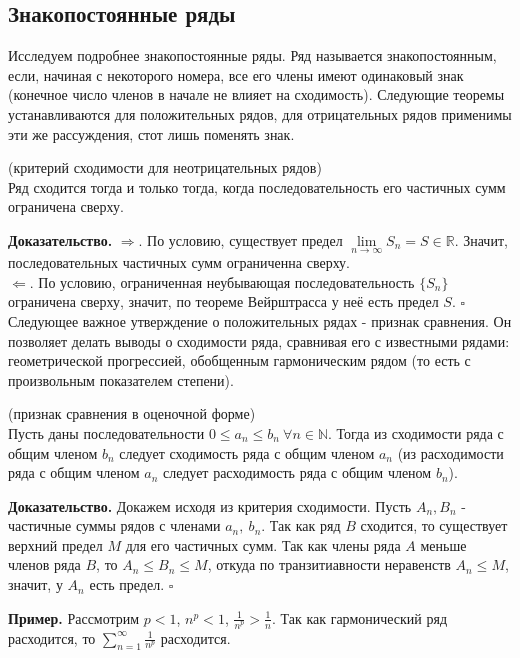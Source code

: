 \subsection{Знакопостоянные ряды}
Исследуем подробнее знакопостоянные ряды. Ряд называется знакопостоянным,
если, начиная с некоторого номера, все его члены имеют одинаковый знак
(конечное число членов в начале не влияет на сходимость). Следующие теоремы 
устанавливаются для положительных рядов, для отрицательных рядов применимы
эти же рассуждения, стот лишь поменять знак.
\begin{theor}
    (критерий сходимости для неотрицательных рядов)\\
    Ряд сходится тогда и только тогда, когда последовательность его
    частичных сумм ограничена сверху.
\end{theor}
\textbf{Доказательство.}
$\Rightarrow$. По условию, существует предел 
$\lim\limits_{n \to \infty} S_n=S\in \mathbb{R}$. Значит, последовательных 
частичных сумм ограниченна сверху.\\
$\Leftarrow$. По условию, ограниченная неубывающая последовательность 
$\{S_n\}$ ограничена сверху, значит, по теореме
Вейрштрасса у неё есть предел  $S$. $\square$\\
Следующее важное утверждение о положительных рядах - признак сравнения. Он
позволяет делать выводы о сходимости ряда, сравнивая его с известными рядами:
геометрической прогрессией, обобщенным гармоническим рядом (то есть с 
произвольным показателем степени). 
\begin{theor}
    (признак сравнения в оценочной форме)\\
    Пусть даны последовательности
    $0\leqslant a_n\leqslant b_n~\forall n\in\mathbb{N}$. 
    Тогда из сходимости ряда с общим членом $b_n$ следует сходимость ряда с 
    общим членом $a_n$ (из расходимости ряда с общим членом $a_n$ следует
    расходимость ряда с общим членом $b_n$).
\end{theor}
\textbf{Доказательство.}  Докажем исходя из критерия сходимости.
Пусть $A_n,B_n$ - частичные суммы рядов с членами $a_n,~b_n$.
Так как ряд $B$ сходится, то существует верхний предел $M$ для его частичных 
сумм.
Так как члены ряда $A$ меньше членов ряда $B$, то 
$A_n\leqslant B_n\leqslant M$, откуда по транзитиавности неравенств 
$A_n\leqslant M$, значит, у $A_n$ есть предел. $\square$

\textbf{Пример.}
Рассмотрим $p<1$,  $n^p<1$,  $\frac{1}{n^p}>\frac{1}{n}$. Так как 
гармонический ряд расходится, то $\sum\limits_{n=1}^{\infty}\frac{1}{n^p}$
расходится.

